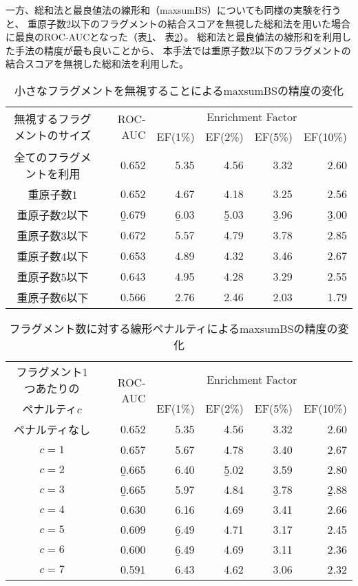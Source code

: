 一方、総和法と最良値法の線形和（maxsumBS）についても同様の実験を行うと、
重原子数2以下のフラグメントの結合スコアを無視した総和法を用いた場合に最良のROC-AUCとなった（表\ref{table:omit_maxsumBS}、
表\ref{table:penalty_maxsumBS}）。
総和法と最良値法の線形和を利用した手法の精度が最も良いことから、
本手法では重原子数2以下のフラグメントの結合スコアを無視した総和法を利用した。
\begin{table}[hb] \centering
	\caption{小さなフラグメントを無視することによるmaxsumBSの精度の変化}
	\label{table:omit_maxsumBS}
	\begin{tabular}{c|rrrrr}
	\hline
	\multirow{2}{*}{無視するフラグメントのサイズ}	&\multirow{2}{*}{ROC-AUC}	&\multicolumn{4}{c}{Enrichment Factor}				\\
										&						&EF(1\%)		&EF(2\%)		&EF(5\%)		&EF(10\%)	\\ \hline
	全てのフラグメントを利用					&0.652					&5.35		&4.56		&3.32		&2.60		\\
	重原子数1							&0.652					&4.67		&4.18		&3.25		&2.56		\\
	重原子数2以下						&\b{0.679}				&\b{6.03}		&\b{5.03}		&\b{3.96}		&\b{3.00}		\\
	重原子数3以下						&0.672					&5.57		&4.79		&3.78		&2.85		\\
	重原子数4以下						&0.653					&4.89		&4.32		&3.46		&2.67		\\
	重原子数5以下						&0.643					&4.95		&4.28		&3.29		&2.55		\\
	重原子数6以下						&0.566					&2.76		&2.46		&2.03		&1.79		\\ \hline
	\end{tabular}
\end{table}
\begin{table}[hb] \centering
	\caption{フラグメント数に対する線形ペナルティによるmaxsumBSの精度の変化}
	\label{table:penalty_maxsumBS}
	\begin{tabular}{c|rrrrr}
	\hline
	フラグメント1つあたりの	&\multirow{2}{*}{ROC-AUC}	&\multicolumn{4}{c}{Enrichment Factor}				\\
	ペナルティ$c$			&						&EF(1\%)		&EF(2\%)		&EF(5\%)		&EF(10\%)	\\ \hline
	ペナルティなし			&0.652					&5.35		&4.56		&3.32		&2.60		\\
	$c=1$				&0.657					&5.67		&4.78		&3.40		&2.67		\\
	$c=2$				&\b{0.665}				&6.40		&\b{5.02}		&3.59		&2.80		\\
	$c=3$				&\b{0.665}				&5.97		&4.84		&\b{3.78}		&\b{2.88}		\\
	$c=4$				&0.630					&6.16		&4.69		&3.41		&2.66		\\
	$c=5$				&0.609					&\b{6.49}		&4.71		&3.17		&2.45		\\
	$c=6$				&0.600					&\b{6.49}		&4.69		&3.11		&2.36		\\
	$c=7$				&0.591					&6.43		&4.62		&3.06		&2.32		\\ \hline
	\end{tabular}
\end{table}

